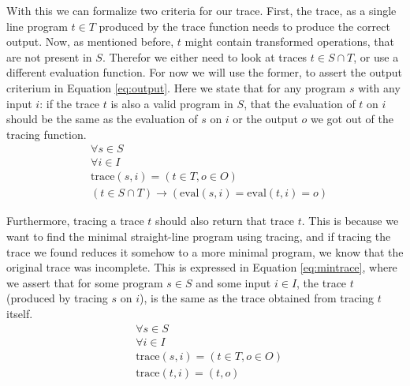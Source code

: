         With this we can formalize two criteria for our trace.
        First, the trace, as a single line program $t\in T$ produced by the trace function needs to produce the correct output.
        Now, as mentioned before, $t$ might contain transformed operations, that are not present in $S$.
        Therefor we either need to look at traces $t\in S\cap T$, or use a different evaluation function.
        For now we will use the former, to assert the output criterium in Equation \ref{eq:output}.
        Here we state that for any program $s$ with any input $i$: if the trace $t$ is also a valid program in $S$, that the evaluation of $t$ on $i$ should be the same as the evaluation of $s$ on $i$ or the output $o$ we got out of the tracing function.
        \begin{equation}
            \begin{aligned}
                &\forall s\in S\\
                &\forall i\in I\\
                &\text{trace}(s,i)=(t\in T,o\in O)\\
                &(t\in S\cap T)\to(\text{eval}(s,i)=\text{eval}(t,i)=o)
            \end{aligned}
            \label{eq:output}
        \end{equation}

        Furthermore, tracing a trace $t$ should also return that trace $t$.
        This is because we want to find the minimal straight-line program using tracing, and if tracing the trace we found reduces it somehow to a more minimal program, we know that the original trace was incomplete.
        This is expressed in Equation \ref{eq:mintrace}, where we assert that for some program $s\in S$ and some input $i\in I$, the trace $t$ (produced by tracing $s$ on $i$), is the same as the trace obtained from tracing $t$ itself.
        \begin{equation}
            \begin{aligned}
                &\forall s\in S\\
                &\forall i\in I\\
                &\text{trace}(s,i)=(t\in T,o\in O)\\
                &\text{trace}(t,i)=(t,o)
            \end{aligned}
            \label{eq:mintrace}
        \end{equation}

